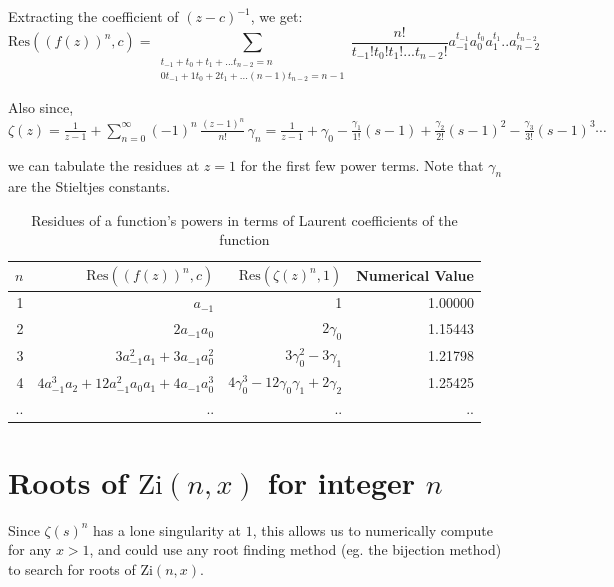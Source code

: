 \documentclass[a4paper,11pt,twoside]{amsart}
\newcommand\Zi{\mathrm{Zi}}
\newcommand\Res{\mathrm{Res}}
\begin{document}
Extracting the coefficient of $(z-c)^{-1}$, we get:
$$\Res((f(z))^n,c) =  
\sum\limits_{\substack{t_{-1} + t_0 + t_1 + ... t_{n-2} = n \\ 0t_{-1} + 1t_0 + 2t_1 + ... (n-1)t_{n-2} = n-1}} \frac{n!}{t_{-1}!t_{0}!t_{1}!...t_{n-2}!} a_{-1}^{t_{-1}} a_{0}^{t_0}a_{1}^{t_1}..a_{n-2}^{t_{n-2}}$$
 
Also since,\\
$\zeta(z) = \frac{1}{z-1} + \sum\limits_{n=0}^{\infty} (-1)^n\,\frac{(z-1)^n}{n!}\, \gamma_n = \frac{1}{z-1} + \gamma_0 - \frac{\gamma_1}{1!}(s-1) + \frac{\gamma_2}{2!}(s-1)^2 - \frac{\gamma_3}{3!}(s-1)^3 \cdots$

we can tabulate the residues at $z=1$ for the first few power terms. Note that $\gamma_n$ are the Stieltjes constants. 

\begin{table}[H]
  \begin{center}
    \caption{Residues of a function's powers in terms of Laurent coefficients of the function}
    \label{tab:table1}
    \begin{tabular}{r|r|r|r} %
      $n$ & $\Res((f(z))^n,c)$ &  $\Res(\zeta(z)^{n},1)$ & Numerical Value\\
      \hline
      1 &  $a_{-1}$ & 1 & 1.00000\\
      2 &  $2a_{-1}a_{0}$ & $2\gamma_0$ & 1.15443\\
      3 &  $3a_{-1}^2 a_{1} + 3a_{-1} a_{0}^2$ & $3\gamma_0^2-3\gamma_1$ & 1.21798\\
      4 &  $4a_{-1}^3 a_{2} + 12a_{-1}^2 a_{0} a_{1} + 4a_{-1} a_{0}^3$ & $4\gamma_0^3-12\gamma_0\gamma_1 +2\gamma_2$ & 1.25425\\
      .. & .. & .. & ..\\
    \end{tabular}
  \end{center}
\end{table}


\section{Roots of $\Zi(n,x)$ for integer $n$}

Since $\zeta(s)^{n}$ has a lone singularity at $1$, this allows us to numerically compute for any $x>1$, and could use any root finding method (eg. the bijection method) to search for roots of $\Zi(n,x)$.
\end{document}
